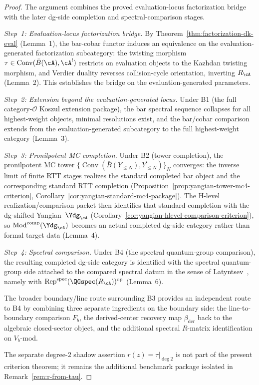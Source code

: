 \begin{proof}
The argument combines the proved evaluation-locus factorization bridge
with the later dg-side completion and spectral-comparison stages.

\emph{Step~1: Evaluation-locus factorization bridge.}
By Theorem~\ref{thm:factorization-dk-eval} (Lemma~1), the
bar-cobar functor induces an equivalence on the evaluation-generated
factorization subcategory:
the twisting morphism
$\tau \in \operatorname{Conv}(\bar B(\cA),\cA^!)$ restricts on evaluation objects
to the Kazhdan twisting morphism, and Verdier duality reverses
collision-cycle orientation, inverting $R_\cA$ (Lemma~2).
This establishes the bridge on the evaluation-generated
parameters.

\emph{Step~2: Extension beyond the evaluation-generated locus.}
Under B1 (the full category-$\mathcal{O}$ Koszul extension package),
the bar spectral sequence collapses for all highest-weight objects,
minimal resolutions exist, and the bar/cobar comparison extends from
the evaluation-generated subcategory to the full highest-weight
category (Lemma~3).

\emph{Step~3: Pronilpotent MC completion.}
Under B2 (tower completion), the pronilpotent MC tower
$\{\operatorname{Conv}(\bar B(Y_{\le N}), Y_{\le N}^!)\}_N$ converges:
the inverse limit of finite RTT stages realizes the standard completed
bar object and the corresponding standard RTT completion
\textup{(}Proposition~\ref{prop:yangian-tower-mc4-criterion},
Corollary~\ref{cor:yangian-standard-mc4-package}\textup{)}. The
H-level realization/comparison packet then identifies that standard
completion with the dg-shifted Yangian~$\Ydg_{\cA}$
\textup{(}Corollary~\ref{cor:yangian-hlevel-comparison-criterion}\textup{)}, so
$\operatorname{Mod}^{\mathrm{comp}}(\Ydg_{\cA})$ becomes an actual
completed dg-side category rather than formal target data (Lemma~4).

\emph{Step~4: Spectral comparison.}
Under B4 (the spectral quantum-group comparison), the resulting
completed dg-side category is identified with the spectral
quantum-group side attached to the compared spectral datum in the sense
of Latyntsev~\cite{Latyntsev23}, namely with
$\operatorname{Rep}^{\mathrm{spec}}(\QGspec(R_{\cA}))^{\mathrm{op}}$
(Lemma~6).

The broader boundary/line route surrounding B3 provides an
independent route to B4 by
combining three separate ingredients on the boundary side: the
line-to-boundary comparison $F_b$, the derived-center recovery map
$\beta_{\mathrm{der}}$ back to the algebraic closed-sector object,
and the additional spectral $R$-matrix identification on $V_b$-mod.

The separate degree-$2$ shadow assertion
$r(z)=\tau|_{\deg 2}$ is not part of the present criterion theorem;
it remains the additional benchmark package isolated in
Remark~\ref{rem:r-from-tau}.
\end{proof}

